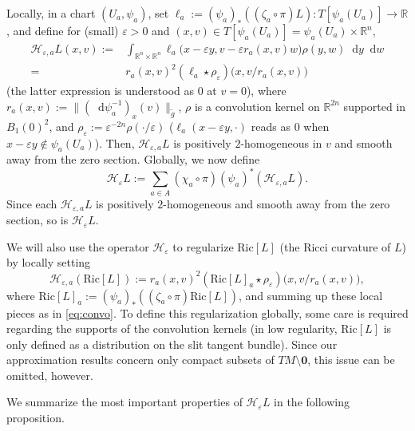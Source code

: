 \documentclass[a4paper,11pt]{article}
\numberwithin{equation}{section}
\theoremstyle{definition}
\theoremstyle{plain}
\newcommand{\R}{\mathbb R}
\newcommand{\eps}{\varepsilon}
\newcommand{\Ric}{\mathrm{Ric}}
\newcommand*\diff{\mathop{}\!\mathrm{d}}
\begin{document}
Locally, in a chart $(U_a, \psi_a)$, set $\ell_a:=({\psi}_{a})_* (( \zeta_{a} \circ \pi) L)\colon T[\psi_a(U_a)] \to \R$, and define for (small) $\eps>0$ and $(x,v) \in T[\psi_a(U_a)]=\psi_a(U_a) \times \R^n$,
\begin{equation}\label{eq:HeaL}
\begin{split}
    \mathcal{H}_{\eps, a} L(x,v):= &\int_{\R^n \times \R^n} \ell_a \bigl( x-\eps y, v- \eps r_a(x,v)w \bigr) \rho(y,w) \diff y \diff w \\
    = \; &r_a(x,v)^2 (\ell_a \star \rho_\eps)\bigl( x,v/r_a(x,v)\bigr)
\end{split}
\end{equation}
(the latter expression is understood as $0$ at $v=0$),
where $r_a(x,v):=\| (\diff \psi_a^{-1})_x(v)\|_{\tilde g}$, $\rho$ is a convolution kernel on $\R^{2n}$ supported in $B_1(0)^2$, and $\rho_\eps := \eps^{-2n} \rho(\cdot / \eps)$
($\ell_a(x-\eps y,\cdot)$ reads as $0$ when $x-\eps y \not\in \psi_a(U_a)$).
Then, $\mathcal{H}_{\eps, a} L$ is positively $2$-homogeneous in $v$ and smooth away from the zero section.
Globally, we now define
\begin{equation}
\label{eq:convo}
    \mathcal{H}_\eps L:= \sum_{a \in A} (\chi_a \circ \pi)(\psi_a)^{*} (\mathcal{H}_{\eps,a} L).
\end{equation}
Since each $\mathcal{H}_{\eps,a} L$ is positively $2$-homogeneous and smooth away from the zero section, so is $\mathcal{H}_\eps L$.

We will also use the operator $\mathcal{H}_\eps$ to regularize $\Ric[L]$ (the Ricci curvature of $L$) by locally setting
\begin{equation*}
    \mathcal{H}_{\eps,a}(\Ric[L]) := r_a(x,v)^2 (\Ric[L]_a \star \rho_\eps)\bigl( x,v/r_a(x,v) \bigr),
\end{equation*}
where $\Ric[L]_a := (\psi_a)_*((\zeta_a \circ \pi) \Ric[L])$, and summing up these local pieces as in \eqref{eq:convo}.
To define this regularization globally, some care is required regarding the supports of the convolution kernels (in low regularity, $\Ric[L]$ is only defined as a distribution on the slit tangent bundle).
Since our approximation results concern only compact subsets of $TM \setminus \mathbf{0}$, this issue can be omitted, however.

We summarize the most important properties of $\mathcal{H}_\eps L$ in the following proposition.
\end{document}
